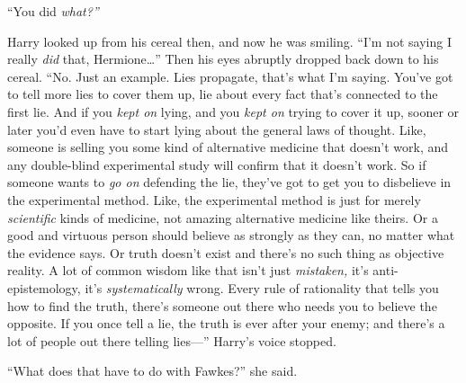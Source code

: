 ``You did \emph{what?''}

Harry looked up from his cereal then, and now he was smiling. ``I'm not
saying I really \emph{did} that, Hermione\ldots{}'' Then his eyes
abruptly dropped back down to his cereal. ``No. Just an example. Lies
propagate, that's what I'm saying. You've got to tell more lies to cover
them up, lie about every fact that's connected to the first lie. And if
you \emph{kept on} lying, and you \emph{kept on} trying to cover it up,
sooner or later you'd even have to start lying about the general laws of
thought. Like, someone is selling you some kind of alternative medicine
that doesn't work, and any double-blind experimental study will confirm
that it doesn't work. So if someone wants to \emph{go on} defending the
lie, they've got to get you to disbelieve in the experimental method.
Like, the experimental method is just for merely \emph{scientific} kinds
of medicine, not amazing alternative medicine like theirs. Or a good and
virtuous person should believe as strongly as they can, no matter what
the evidence says. Or truth doesn't exist and there's no such thing as
objective reality. A lot of common wisdom like that isn't just
\emph{mistaken,} it's anti-epistemology, it's \emph{systematically}
wrong. Every rule of rationality that tells you how to find the truth,
there's someone out there who needs you to believe the opposite. If you
once tell a lie, the truth is ever after your enemy; and there's a lot
of people out there telling lies---'' Harry's voice stopped.

``What does that have to do with Fawkes?'' she said.

